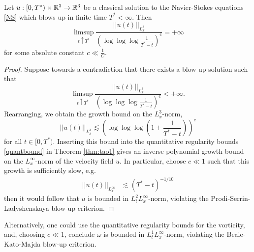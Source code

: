 \begin{corollary}
	Let $u: [0, T^*) \times \mathbb R^3 \to \mathbb R^3$ be a classical solution to the Navier-Stokes equations \eqref{NS} which blows up in finite time $T^* < \infty$. Then 
		\begin{equation}
			\limsup_{t \uparrow T^*} \frac{||u(t)||_{L^3_x}}{(\log \log \log \frac{1}{T^* - t})^{c}} = + \infty
		\end{equation}
	for some absolute constant $c \ll \tfrac1C$.
\end{corollary}

\begin{proof}
	Suppose towards a contradiction that there exists a blow-up solution such that
		\begin{equation*}
			\limsup_{t \uparrow T^*} \frac{||u(t)||_{L^3_x}}{(\log \log \log \frac{1}{T^* - t})^c} < +\infty.
		\end{equation*}
	Rearranging, we obtain the growth bound on the $L^3_x$-norm,
		\begin{equation*}
			||u(t)||_{L^3_x} \lesssim \left(\log \log \log \left(1 + \frac{1}{T^* - t} \right) \right)^c
		\end{equation*}
	for all $t \in [0, T^*)$. Inserting this bound into the quantitative regularity bounds \eqref{quantbound} in Theorem \ref{thm:tao1} gives an inverse polynomial growth bound on the $L^\infty_x$-norm of the velocity field $u$. In particular, choose $c \ll 1$ such that this growth is sufficiently slow, e.g.
		\begin{align*}
			||u(t)||_{L^\infty_x}
				&\lesssim (T^* - t)^{-1/10}
		\end{align*} 		 
	then it would follow that $u$ is bounded in $L^2_t L^\infty_x$-norm, violating the Prodi-Serrin-Ladyshenskaya blow-up criterion. 
\end{proof}

\begin{remark}
	Alternatively, one could use the quantitative regularity bounds for the vorticity, and, choosing $c \ll 1$, conclude $\omega$ is bounded in $L^1_t L^\infty_x$-norm, violating the Beale-Kato-Majda blow-up criterion.  
\end{remark}

